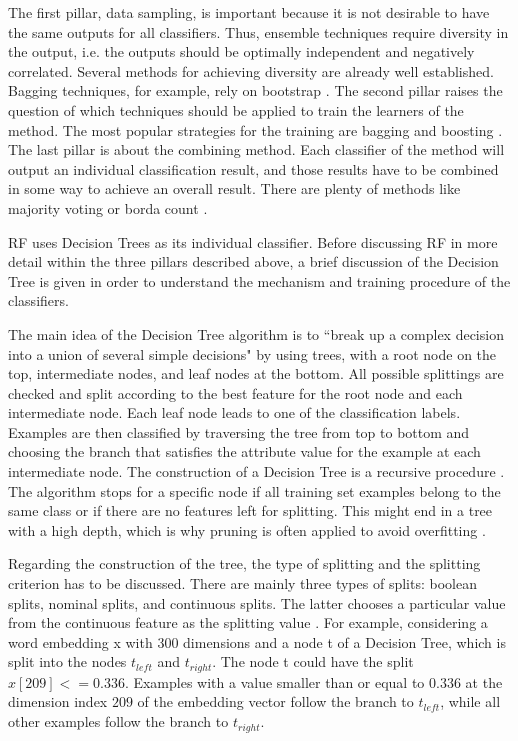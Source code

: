 \documentclass[12pt, a4paper, titlepage]{article}
\begin{document}
The first pillar, data sampling, is important because it is not desirable to have the same outputs for all classifiers. Thus, ensemble techniques require diversity in the output, i.e. the outputs should be optimally independent and negatively correlated. Several methods for achieving diversity are already well established. Bagging techniques, for example, rely on bootstrap \citep{polikar2012}. The second pillar raises the question of which techniques should be applied to train the learners of the method. The most popular strategies for the training are bagging and boosting \citep{polikar2012}. The last pillar is about the combining method. Each classifier of the method will output an individual classification result, and those results have to be combined in some way to achieve an overall result. There are plenty of methods like majority voting or borda count \citep{polikar2012}.

\ac{RF} uses Decision Trees as its individual classifier. Before discussing \ac{RF} in more detail within the three pillars described above, a brief discussion of the Decision Tree is given in order to understand the mechanism and training procedure of the classifiers. 

The main idea of the Decision Tree algorithm is to ``break up a complex decision into a union of several simple decisions" \citep[660]{safavian1991} by using trees, with a root node on the top, intermediate nodes, and leaf nodes at the bottom. All possible splittings are checked and split according to the best feature for the root node and each intermediate node. Each leaf node leads to one of the classification labels. Examples are then classified by traversing the tree from top to bottom and choosing the branch that satisfies the attribute value for the example at each intermediate node. The construction of a Decision Tree is a recursive procedure \citep{Berthold2020, xia2008, cutler2012}. The algorithm stops for a specific node if all training set examples belong to the same class or if there are no features left for splitting. This might end in a tree with a high depth, which is why pruning is often applied to avoid overfitting \citep{Berthold2020}.


Regarding the construction of the tree, the type of splitting and the splitting criterion has to be discussed. There are mainly three types of splits: boolean splits, nominal splits, and continuous splits. The latter chooses a particular value from the continuous feature as the splitting value \citep{cutler2012, Berthold2020}. For example, considering a word embedding x with 300 dimensions and a node t of a Decision Tree, which is split into the nodes $t_{left}$ and $t_{right}$. The node t could have the split $x[209] <= 0.336$. Examples with a value smaller than or equal to $0.336$ at the dimension index $209$ of the embedding vector follow the branch to $t_{left}$, while all other examples follow the branch to $t_{right}$.
\end{document}
